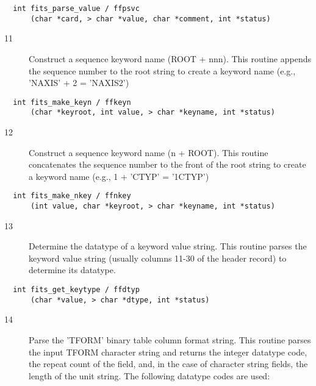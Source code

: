 \begin{verbatim}
  int fits_parse_value / ffpsvc
      (char *card, > char *value, char *comment, int *status)
\end{verbatim}

\begin{description}
\item[11] Construct a sequence keyword name (ROOT + nnn).
    This routine appends the sequence number to the root string to create
   a keyword name (e.g., 'NAXIS' + 2 = 'NAXIS2')
\end{description}

\begin{verbatim}
  int fits_make_keyn / ffkeyn
      (char *keyroot, int value, > char *keyname, int *status)
\end{verbatim}

\begin{description}
\item[12] Construct a sequence keyword name (n + ROOT).
    This routine concatenates the sequence number to the front of the
   root string to create a keyword name (e.g., 1 + 'CTYP' = '1CTYP')
\end{description}

\begin{verbatim}
  int fits_make_nkey / ffnkey
      (int value, char *keyroot, > char *keyname, int *status)
\end{verbatim}

\begin{description}
\item[13] Determine the datatype of a keyword value string.
    This routine parses the keyword value string (usually columns 11-30
   of the header record) to determine its datatype.
\end{description}

\begin{verbatim}
  int fits_get_keytype / ffdtyp
      (char *value, > char *dtype, int *status)
\end{verbatim}

\begin{description}
\item[14] Parse the 'TFORM' binary table column format string.
    This routine parses the input TFORM character string and returns the
    integer datatype code, the repeat count of the field, and, in the case
    of character string fields, the length of the unit string.  The following
   datatype codes are used:
\end{description}

